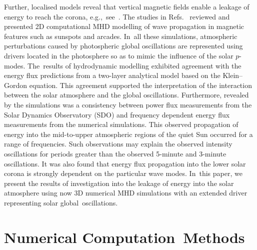 \documentclass[physics,article,accept,pdftex,moreauthors]{Definitions/mdpi}
\begin{document}




Further, localised models reveal that vertical magnetic fields enable a leakage of energy to reach the corona, 
e.g.,~see~\cite{Khomenko2013,Santamaria2015}.   The %
 {studies in Refs.}~\cite{Khomenko2013,Santamaria2015} reviewed and presented 2D computational MHD modelling of wave propagation in magnetic features such as sunspots and arcades.  In~all these simulations, atmospheric perturbations caused by photospheric global oscillations are represented using drivers located in the photosphere so as to mimic the influence of the solar $p$-modes. The~results of hydrodynamic modelling exhibited agreement  with the energy flux predictions from a two-layer analytical model based on the Klein--Gordon equation. This agreement supported the interpretation of the interaction between the solar atmosphere and the global oscillations. Furthermore, revealed by the simulations  was a consistency between power flux measurements 
from 
 {the Solar Dynamics Observatory 
(SDO)} 
and frequency dependent energy flux measurements from the numerical simulations. This observed propagation of energy into the mid-to-upper atmospheric regions of the 
 {quiet} %
Sun occurred for a range of frequencies. Such observations may explain the observed intensity oscillations for periods greater than the 
{observed} %
5-minute and 3-minute oscillations. It was also found that energy flux propagation into the lower solar corona is strongly dependent on the particular wave modes. In~this paper, we present the results of investigation into the leakage of energy into the solar atmosphere using now 3D numerical MHD simulations with an extended driver representing solar global~oscillations. 







\section{Numerical Computation~Methods}
\end{document}
